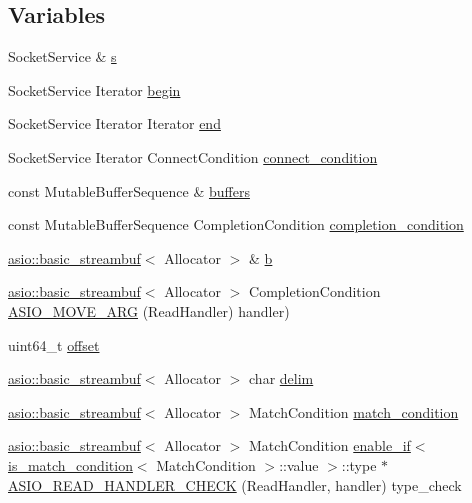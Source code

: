 \subsection*{Variables}
\begin{DoxyCompactItemize}
\item 
Socket\+Service \& \hyperlink{group__async__connect_ga31ab74b9ea6c77932dddd016cfc7920a}{s}
\item 
Socket\+Service Iterator \hyperlink{group__async__connect_ga7055bca9225050c030c19c7dc926fa53}{begin}
\item 
Socket\+Service Iterator Iterator \hyperlink{group__async__connect_gadb6ad0193229ae84828688e812cd325c}{end}
\item 
Socket\+Service Iterator Connect\+Condition \hyperlink{group__async__connect_ga47e3dda205dfba3553f4c7e005897687}{connect\+\_\+condition}
\item 
const Mutable\+Buffer\+Sequence \& \hyperlink{group__async__read_ga54dede45c3175148a77fe6635222c47d}{buffers}
\item 
const Mutable\+Buffer\+Sequence Completion\+Condition \hyperlink{group__async__read_gae2e215d5013596cc2b385bb6c13fa518}{completion\+\_\+condition}
\item 
\hyperlink{classasio_1_1basic__streambuf}{asio\+::basic\+\_\+streambuf}$<$ Allocator $>$ \& \hyperlink{group__async__read_ga945a5c18fa77a9e2eba420f8f44b2a4f}{b}
\item 
\hyperlink{classasio_1_1basic__streambuf}{asio\+::basic\+\_\+streambuf}$<$ Allocator $>$ Completion\+Condition \hyperlink{group__async__read_ga6d72a97784dde9476c6d93b8904a4967}{A\+S\+I\+O\+\_\+\+M\+O\+V\+E\+\_\+\+A\+R\+G} (Read\+Handler) handler)
\item 
uint64\+\_\+t \hyperlink{group__async__read__at_ga8dcdb41a4adfd6fe5322b5dd666d9f29}{offset}
\item 
\hyperlink{classasio_1_1basic__streambuf}{asio\+::basic\+\_\+streambuf}$<$ Allocator $>$ char \hyperlink{group__async__read__until_gafbf62a75ad736aff941c1f70d4b3c223}{delim}
\item 
\hyperlink{classasio_1_1basic__streambuf}{asio\+::basic\+\_\+streambuf}$<$ Allocator $>$ Match\+Condition \hyperlink{group__async__read__until_ga950b81fb954e4a0f01e13a57e15721b4}{match\+\_\+condition}
\item 
\hyperlink{classasio_1_1basic__streambuf}{asio\+::basic\+\_\+streambuf}$<$ Allocator $>$ Match\+Condition \hyperlink{structasio_1_1enable__if}{enable\+\_\+if}$<$ \hyperlink{structasio_1_1is__match__condition}{is\+\_\+match\+\_\+condition}$<$ Match\+Condition $>$\+::value $>$\+::type $\ast$ \hyperlink{namespaceasio_aa65c0ded2d2baf1e7bd7141628710c64}{A\+S\+I\+O\+\_\+\+R\+E\+A\+D\+\_\+\+H\+A\+N\+D\+L\+E\+R\+\_\+\+C\+H\+E\+C\+K} (Read\+Handler, handler) type\+\_\+check

\end{DoxyCompactItemize}
